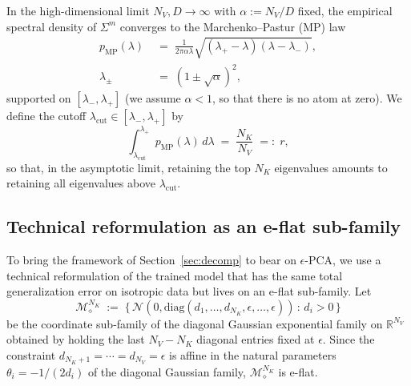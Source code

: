 \documentclass[11pt,a4paper]{article}
\theoremstyle{definition}
\theoremstyle{remark}
\newcommand{\R}{\mathbb{R}}
\newcommand{\NK}{N_K}
\newcommand{\NV}{N_V}
\newcommand{\Mfam}{\mathcal{M}}
\begin{document}
In the high-dimensional limit
$\NV, D \to \infty$ with $\alpha := \NV/D$ fixed, the empirical
spectral density of $\Sigma^{m}$ converges to the
Marchenko--Pastur (MP) law \cite{MarchenkoPastur1967}
\begin{align}
  p_{\mathrm{MP}}(\lambda)
  &\;=\; \frac{1}{2\pi\alpha\lambda}
        \sqrt{(\lambda_{+}-\lambda)(\lambda-\lambda_{-})},
  \nonumber \\
  \lambda_{\pm} &\;=\; (1 \pm \sqrt{\alpha})^{2},
  \label{eq:MPdensity}
\end{align}
supported on $[\lambda_{-},\lambda_{+}]$ (we assume $\alpha < 1$, so
that there is no atom at zero).
We define the cutoff
$\lambda_{\mathrm{cut}} \in [\lambda_{-},\lambda_{+}]$ by
\begin{equation}
  \int_{\lambda_{\mathrm{cut}}}^{\lambda_{+}}
       p_{\mathrm{MP}}(\lambda)\,d\lambda
  \;=\; \frac{\NK}{\NV} \;=:\; r ,
  \label{eq:cutoffdef}
\end{equation}
so that, in the asymptotic limit, retaining the top $\NK$
eigenvalues amounts to retaining all eigenvalues above
$\lambda_{\mathrm{cut}}$.

\subsection{Technical reformulation as an e-flat sub-family}
\label{sec:variant4}

To bring the framework of Section~\ref{sec:decomp} to bear on
$\epsilon$-PCA, we use a technical reformulation of the trained
model that has the same total generalization error on isotropic
data but lives on an e-flat sub-family. Let
\begin{equation}
  \Mfam_{\diamond}^{\NK}
  \;:=\;
  \big\{\,\mathcal{N}(0, \mathrm{diag}(d_{1},\ldots,d_{\NK},
                                        \epsilon, \ldots, \epsilon))
   \,:\, d_{i} > 0\,\big\}
  \label{eq:Mfam-diamond}
\end{equation}
be the coordinate sub-family of the diagonal Gaussian
exponential family on $\R^{\NV}$ obtained by holding the last
$\NV - \NK$ diagonal entries fixed at $\epsilon$. Since
the constraint $d_{\NK+1} = \cdots = d_{\NV} = \epsilon$ is
affine in the natural parameters $\theta_{i} = -1/(2 d_{i})$ of
the diagonal Gaussian family, $\Mfam_{\diamond}^{\NK}$ is e-flat.
\end{document}
